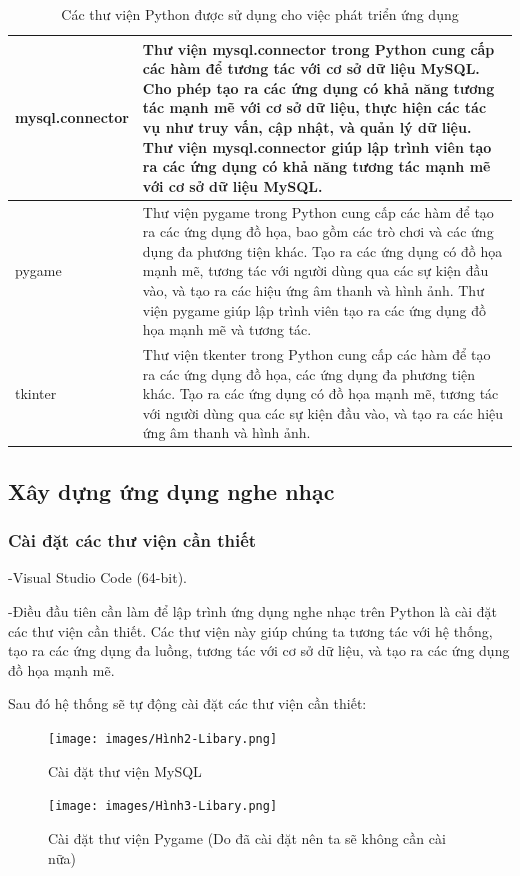\documentclass[a4paper]{article}
\begin{document}
\begin{table}[h]
\begin{tabular}{|l|p{10cm}|}
		\hline
		mysql.connector   & Thư viện mysql.connector trong Python cung cấp các hàm để tương tác với cơ sở dữ liệu MySQL. Cho phép tạo ra các ứng dụng có khả năng tương tác mạnh mẽ với cơ sở dữ liệu, thực hiện các tác vụ như truy vấn, cập nhật, và quản lý dữ liệu. Thư viện mysql.connector giúp lập trình viên tạo ra các ứng dụng có khả năng tương tác mạnh mẽ với cơ sở dữ liệu MySQL.                                                                                                       \\
		\hline
		pygame            & Thư viện pygame trong Python cung cấp các hàm để tạo ra các ứng dụng đồ họa, bao gồm các trò chơi và các ứng dụng đa phương tiện khác. Tạo ra các ứng dụng có đồ họa mạnh mẽ, tương tác với người dùng qua các sự kiện đầu vào, và tạo ra các hiệu ứng âm thanh và hình ảnh. Thư viện pygame giúp lập trình viên tạo ra các ứng dụng đồ họa mạnh mẽ và tương tác.                                                                                                         \\
		\hline
		tkinter           & Thư viện tkenter trong Python cung cấp các hàm để tạo ra các ứng dụng đồ họa, các ứng dụng đa phương tiện khác. Tạo ra các ứng dụng có đồ họa mạnh mẽ, tương tác với người dùng qua các sự kiện đầu vào, và tạo ra các hiệu ứng âm thanh và hình ảnh.                                                                                                                                                                                                                     \\
		\hline
	\end{tabular}
	\caption{Các thư viện Python được sử dụng cho việc phát triển ứng dụng}
	\label{tab:my_label}
\end{table}
\clearpage
\newpage
\subsection{Xây dựng ứng dụng nghe nhạc}
\subsubsection{Cài đặt các thư viện cần thiết}
\begin{flushleft}
	-Visual Studio Code (64-bit).

	-Điều đầu tiên cần làm để lập trình ứng dụng nghe nhạc trên Python là cài đặt các thư viện cần thiết.
	Các thư viện này giúp chúng ta tương tác với hệ thống, tạo ra các ứng dụng đa luồng,
	tương tác với cơ sở dữ liệu, và tạo ra các ứng dụng đồ họa mạnh mẽ.

	Sau đó hệ thống sẽ tự động cài đặt các thư viện cần thiết:
	\begin{figure}[h]
		\centering
		\texttt{[image: images/Hình2-Libary.png]}
		\caption{Cài đặt thư viện MySQL}
	\end{figure}
	\begin{figure}[h]
		\centering
		\texttt{[image: images/Hình3-Libary.png]}
		\caption{Cài đặt thư viện Pygame (Do đã cài đặt nên ta sẽ không cần cài nữa)}
	\end{figure}
\end{flushleft}
\end{document}

